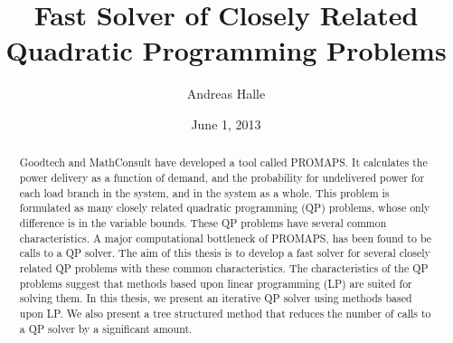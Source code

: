 \documentclass[a4paper,12pt]{report}
\begin{document}
\title{Fast Solver of Closely Related Quadratic Programming
       Problems}
\date{June 1, 2013}
\author{Andreas Halle}
\maketitle
\thispagestyle{empty}
\newpage

\begin{abstract}
Goodtech and MathConsult have developed a tool called PROMAPS.
It calculates the power delivery as a function of demand, and the probability
for undelivered power for each load branch in the system, and in the
system as a whole. This problem is formulated as many closely related 
quadratic programming (QP) problems, whose only difference is in the variable
bounds. These QP problems have several common characteristics.
A major computational bottleneck of PROMAPS, has been found to be
calls to a QP solver. The aim of this thesis is to develop a fast solver for
several closely related QP problems with these common characteristics.
The characteristics of the
QP problems suggest that methods based upon linear programming (LP) are
suited for solving them. In this thesis, we present an iterative QP solver
using methods based upon LP. We also present a tree structured
method that reduces the number of calls to a QP solver by a significant amount.

\end{abstract}
\newpage
\end{document}
